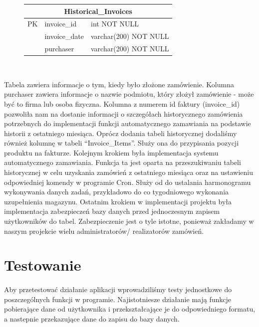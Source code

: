 \documentclass{article}
\begin{document}
\begin{figure}[H]
   \centering
   \begin{tabular}{|c|l|l|} \hline
      \multicolumn{3}{|c|}{Historical\_Invoices} \\ \hline
      PK & invoice\_id   & int NOT NULL          \\ \hline
         & invoice\_date & varchar(200) NOT NULL \\
         & purchaser     & varchar(200) NOT NULL \\ \hline
   \end{tabular} \\
\end{figure}
\vspace{0.3cm}
Tabela zawiera informacje o tym, kiedy było złożone zamówienie.
Kolumna purchaser zawiera informacje o nazwie podmiotu, który złożył zamówienie
- może być to firma lub osoba fizyczna. Kolumna z numerem id faktury (invoice\_id) pozwoliła nam na
dostanie informacji o szczegółach historycznego zamówienia potrzebnych do implementacji funkcji
automatycznego zamawiania na podstawie historii z ostatniego miesiąca. Oprócz dodania tabeli
historycznej dodaliśmy również kolumnę w tabeli ``Invoice\_Items''. Służy ona do przypisania pozycji
produktu na fakturze. Kolejnym krokiem była implementacja systemu automatycznego zamawiania. Funkcja ta jest oparta na przeszukiwaniu tabeli
historycznej w celu uzyskania zamówień z ostatniego miesiąca oraz na ustawieniu odpowiedniej komendy
w programie Cron. Służy od do ustalania harmonogramu wykonywania danych zadań, przykładowo do
co tygodniowego wykonania uzupełnienia magazynu. Ostatnim krokiem w implementacji projektu była
implementacja zabezpieczeń bazy danych przed jednoczesnym zapisem użytkowników do tabel.
Zabezpieczenie jest o tyle istotne, ponieważ zakładamy w naszym projekcie wielu administratorów/
realizatorów zamówień. 

\section{Testowanie}
\paragraph{}
Aby przetestować działanie aplikacji wprowadziliśmy testy jednostkowe do poszczególnych funkcji w
programie.
Najistotniesze działanie mają funkcje pobierające dane od użytkownika i przekształcające je do
odpowiedniego formatu, a nastepnie przekazujące dane do zapisu do bazy danych. 
\end{document}
